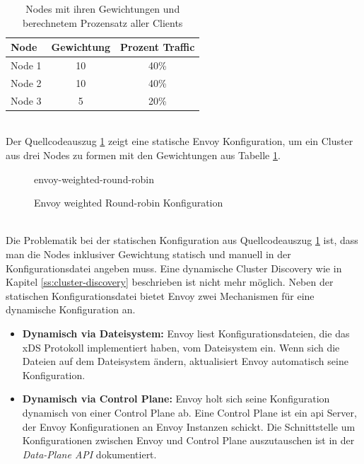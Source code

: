 \begin{table}[h!]
\centering
\renewcommand{\arraystretch}{1.5}
\begin{tabular}{|l|c|c|}
    \hline
    \textbf{Node} & \textbf{Gewichtung} & \textbf{Prozent Traffic} \\
    \hline
    \hline
    Node 1 & 10 & 40\% \\
    \hline
    Node 2 & 10 & 40\% \\
    \hline
    Node 3 & 5 & 20\% \\
    \hline
\end{tabular}
\caption{Nodes mit ihren Gewichtungen und berechnetem Prozensatz aller Clients}
\label{table:example-cluster-weight}
\end{table}
\\
Der Quellcodeauszug \ref{code:envoy-cluster-weight} zeigt eine statische Envoy Konfiguration, um ein Cluster aus drei Nodes zu formen mit den Gewichtungen aus Tabelle \ref{table:example-cluster-weight}.
\begin{figure}
    {envoy-weighted-round-robin}
    \caption{Envoy weighted Round-robin Konfiguration}
    \label{code:envoy-cluster-weight}
\end{figure}
\\
Die Problematik bei der statischen Konfiguration aus Quellcodeauszug \ref{code:envoy-cluster-weight} ist, dass man die Nodes inklusiver Gewichtung statisch und manuell in der Konfigurationsdatei angeben muss. Eine dynamische Cluster Discovery wie in Kapitel \ref{ss:cluster-discovery} beschrieben ist nicht mehr möglich.
Neben der statischen Konfigurationsdatei bietet Envoy zwei Mechanismen für eine dynamische Konfiguration an.
\begin{itemize}
  \item \textbf{Dynamisch via Dateisystem:} Envoy liest Konfigurationsdateien, die das xDS Protokoll implementiert haben, vom Dateisystem ein. Wenn sich die Dateien auf dem Dateisystem ändern, aktualisiert Envoy automatisch seine Konfiguration.
    \cite{ConfigurationDynamicFilesystem}
  \item \textbf{Dynamisch via Control Plane:} Envoy holt sich seine Konfiguration dynamisch von einer Control Plane ab. Eine Control Plane ist ein \ac{api} Server, der Envoy Konfigurationen an Envoy Instanzen schickt. Die Schnittstelle um Konfigurationen zwischen Envoy und Control Plane auszutauschen ist in der \textit{Data-Plane API}\cite{EnvoyproxyDataplaneapi2021} dokumentiert.
    \cite{ConfigurationDynamicControl}
\end{itemize}
